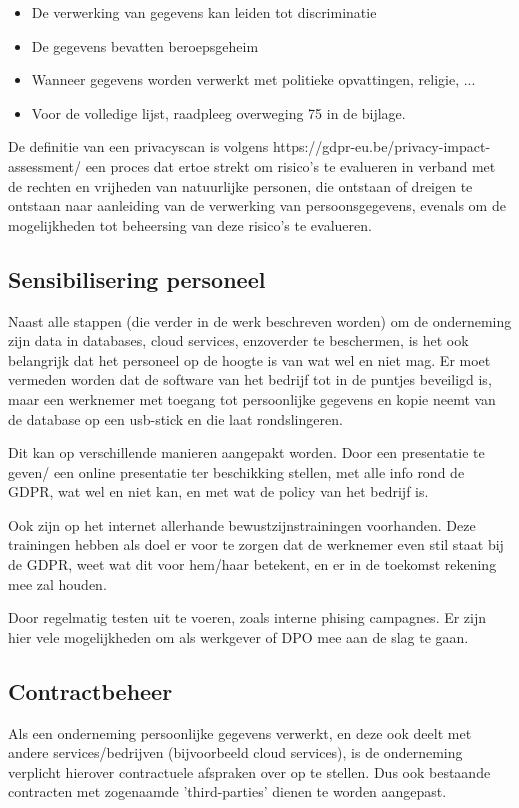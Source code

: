\begin{itemize}
	\item De verwerking van gegevens kan leiden tot discriminatie
	\item De gegevens bevatten beroepsgeheim
	\item Wanneer gegevens worden verwerkt met politieke opvattingen, religie, ... 
	\item Voor de volledige lijst, raadpleeg overweging 75 in de bijlage. 
\end{itemize}

De definitie van een privacyscan is volgens https://gdpr-eu.be/privacy-impact-assessment/ een proces dat ertoe strekt om risico’s te evalueren in verband met de rechten en vrijheden van natuurlijke personen, die ontstaan of dreigen te ontstaan naar aanleiding van de verwerking van persoonsgegevens, evenals om de mogelijkheden tot beheersing van deze risico’s te evalueren.

\subsection{Sensibilisering personeel}
Naast alle stappen (die verder in de werk beschreven worden) om de onderneming zijn data in databases, cloud services, enzoverder te beschermen, is het ook belangrijk dat het personeel op de hoogte is van wat wel en niet mag. Er moet vermeden worden dat de software van het bedrijf tot in de puntjes beveiligd is, maar een werknemer met toegang tot persoonlijke gegevens en kopie neemt van de database op een usb-stick en die laat rondslingeren. 

Dit kan op verschillende manieren aangepakt worden.
 Door een presentatie te geven/ een online presentatie ter beschikking stellen, met alle info rond de GDPR, wat wel en niet kan, en met wat de policy van het bedrijf is. 

Ook zijn op het internet allerhande bewustzijnstrainingen voorhanden. Deze trainingen hebben als doel er voor te zorgen dat de werknemer even stil staat bij de GDPR, weet wat dit voor hem/haar betekent, en er in de toekomst rekening mee zal houden.  

Door regelmatig testen uit te voeren, zoals interne phising campagnes. Er zijn hier vele mogelijkheden om als werkgever of DPO mee aan de slag te gaan. 

\subsection{Contractbeheer}
Als een onderneming persoonlijke gegevens verwerkt, en deze ook deelt met andere services/bedrijven (bijvoorbeeld cloud services), is de onderneming verplicht hierover contractuele afspraken over op te stellen. Dus ook bestaande contracten met zogenaamde 'third-parties' dienen te worden aangepast. 

